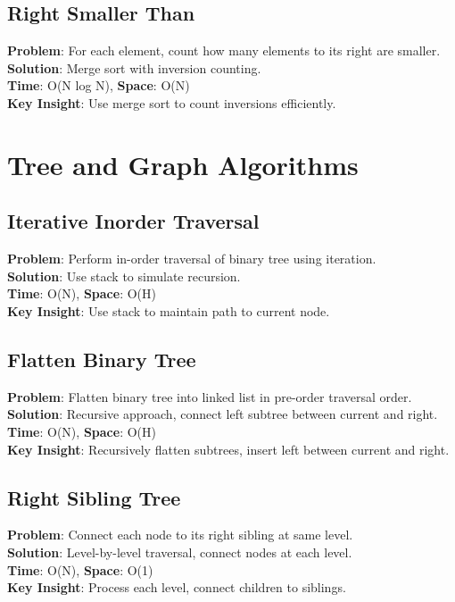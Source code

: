 \documentclass{report}
\begin{document}
\subsection{Right Smaller Than}
\textbf{Problem}: For each element, count how many elements to its right are smaller.\\
\textbf{Solution}: Merge sort with inversion counting.\\
\textbf{Time}: O(N log N), \textbf{Space}: O(N)\\
\textbf{Key Insight}: Use merge sort to count inversions efficiently.

\section{Tree and Graph Algorithms}

\subsection{Iterative Inorder Traversal}
\textbf{Problem}: Perform in-order traversal of binary tree using iteration.\\
\textbf{Solution}: Use stack to simulate recursion.\\
\textbf{Time}: O(N), \textbf{Space}: O(H)\\
\textbf{Key Insight}: Use stack to maintain path to current node.

\subsection{Flatten Binary Tree}
\textbf{Problem}: Flatten binary tree into linked list in pre-order traversal order.\\
\textbf{Solution}: Recursive approach, connect left subtree between current and right.\\
\textbf{Time}: O(N), \textbf{Space}: O(H)\\
\textbf{Key Insight}: Recursively flatten subtrees, insert left between current and right.

\subsection{Right Sibling Tree}
\textbf{Problem}: Connect each node to its right sibling at same level.\\
\textbf{Solution}: Level-by-level traversal, connect nodes at each level.\\
\textbf{Time}: O(N), \textbf{Space}: O(1)\\
\textbf{Key Insight}: Process each level, connect children to siblings.
\end{document}
